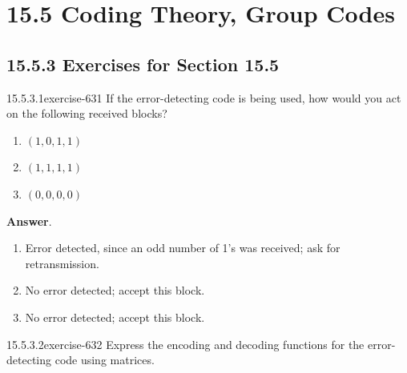 \documentclass[twoside,10pt,]{book}
\numberwithin{equation}{section}
\begin{document}
\section*{15.5 Coding Theory, Group Codes}
\subsection*{15.5.3 Exercises for Section 15.5}
\begin{divisionsolution}{15.5.3.1}{}{exercise-631}%
\hypertarget{p-5653}{}%
If the error-detecting code is being used, how would you act on the following received blocks?\leavevmode%
\begin{enumerate}[label=(\alph*)]
\item\hypertarget{li-2483}{}\hypertarget{p-5654}{}%
\((1, 0, 1, 1)\)%
\item\hypertarget{li-2484}{}\hypertarget{p-5655}{}%
\((1, 1, 1, 1)\)%
\item\hypertarget{li-2485}{}\hypertarget{p-5656}{}%
\((0, 0, 0, 0)\)%
\end{enumerate}
%
\par\smallskip%
\noindent\textbf{Answer}.\quad%
\hypertarget{p-5657}{}%
\leavevmode%
\begin{enumerate}[label=(\alph*)]
\item\hypertarget{li-2486}{}\hypertarget{p-5658}{}%
Error detected, since an odd number of 1's was received; ask for retransmission.%
\item\hypertarget{li-2487}{}\hypertarget{p-5659}{}%
No error detected; accept this block.%
\item\hypertarget{li-2488}{}\hypertarget{p-5660}{}%
No error detected; accept this block.%
\end{enumerate}
%
\end{divisionsolution}%
\begin{divisionsolution}{15.5.3.2}{}{exercise-632}%
\hypertarget{p-5661}{}%
Express the encoding and decoding functions for the error-detecting code using matrices.%
\end{divisionsolution}%
\end{document}
